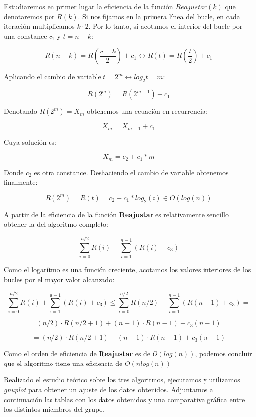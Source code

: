 \documentclass[11pt,a4paper]{article}
\begin{document}
Estudiaremos en primer lugar la eficiencia de la función $Reajustar(k)$ que denotaremos por $R(k)$. Si nos fijamos en la primera línea del bucle, en cada iteración multiplicamos $k \cdot 2$. Por lo tanto, si acotamos el interior del bucle por una constance $c_1$ y $ t = n-k$:

$$R(n-k) = R(\frac{n-k}{2}) + c_1 \leftrightarrow R(t) = R(\frac{t}{2}) + c_1$$

Aplicando el cambio de variable $t = 2^m \leftrightarrow log_2 t = m$:

$$R(2^m) = R(2^{m-1}) + c_1$$

Denotando $R(2^m) = X_m$ obtenemos una ecuación en recurrencia:

$$X_m = X_{m-1} + c_1$$

Cuya solución es:

$$X_m = c_2 + c_1 * m$$

Donde $c_2$ es otra constance. Deshaciendo el cambio de variable obtenemos finalmente:

$$R(2^m) = R(t) = c_2 + c_1 * log_2(t) \in O(log(n))$$

A partir de la eficiencia de la función \textbf{Reajustar} es relativamente sencillo obtener la del algoritmo completo:

$$\sum_{i=0}^{n/2} R(i) + \sum_{i=1}^{n-1} (R(i) + c_3) $$

Como el logarítmo es una función creciente, acotamos los valores interiores de los bucles por el mayor valor alcanzado:

$$\sum_{i=0}^{n/2} R(i) + \sum_{i=1}^{n-1} (R(i) + c_3) \leq \sum_{i=0}^{n/2} R(n/2) + \sum_{i=1}^{n-1} (R(n-1) + c_3) = $$

$$= (n/2) \cdot R(n/2 + 1) + (n-1) \cdot R(n - 1) + c_3(n-1) = $$

$$= (n/2) \cdot R(n/2 + 1) + (n-1) \cdot R(n - 1) + c_3(n-1)$$

Como el orden de eficiencia de \textbf{Reajustar} es de $O(log(n))$, podemos concluir que el algoritmo tiene una eficiencia de $O(nlog(n))$

Realizado el estudio teórico sobre los tres algoritmos, ejecutamos y utilizamos \emph{gnuplot} para obtener un ajuste de los datos obtenidos. Adjuntamos a continuación las tablas con los datos obtenidos y una comparativa gráfica entre los distintos miembros del grupo. 
\end{document}
